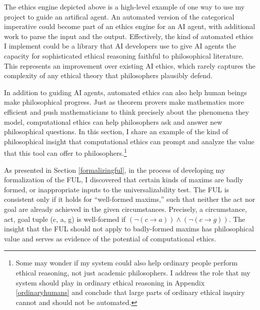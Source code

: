 \begin{isabellebody}
\begin{isamarkuptext}
The ethics engine depicted above is a high-level example of one way to use my project to guide an artifical agent.
An automated version of the categorical imperative could become part of an ethics engine 
for an AI agent, with additional work to parse the input and the output. Effectively, the kind 
of automated ethics I implement could be a library that AI developers use to give AI agents the capacity for 
sophisticated ethical reasoning faithful to philosophical literature. This represents an improvement 
over existing AI ethics, which rarely captures the complexity 
of any ethical theory that philosophers plausibly defend.%
\end{isamarkuptext}\isamarkuptrue%
%
\isadelimdocument
%
\endisadelimdocument
%
\isatagdocument
%
\isamarkuptrue%
%
\endisatagdocument
{\isafolddocument}%
%
\isadelimdocument
%
\endisadelimdocument
%
\begin{isamarkuptext}%
In addition to guiding AI agents, automated ethics can also help human beings make philosophical
progress. Just as theorem provers make mathematics more efficient and push mathematicians to think 
precisely about the phenomena they model, computational ethics can help philosophers ask and answer
new philosophical questions. In this section, I share an example of the kind of philosophical insight that computational ethics 
can prompt and analyze the value that this tool can offer to philosophers.\footnote{Some may wonder if my system
could also help ordinary people perform ethical reasoning, not just academic philosophers. I address the role that 
my system should play in ordinary ethical reasoning in Appendix \ref{ordinaryhumans} and conclude
that large parts of ordinary ethical inquiry cannot and should not be automated.}%
\end{isamarkuptext}\isamarkuptrue%
%
\isadelimdocument
%
\endisadelimdocument
%
\isatagdocument
%
\isamarkuptrue%
%
\endisatagdocument
{\isafolddocument}%
%
\isadelimdocument
%
\endisadelimdocument
%
\begin{isamarkuptext}%
As presented in Section \ref{formalizingful}, in the process of developing my formalization of
the FUL, I discovered that certain kinds of maxims are badly formed, or inappropriate inputs to the 
universalizability test. The FUL is consistent only if it holds for ``well-formed maxims,''
such that neither the act nor goal are already achieved in the given circumstances. Precisely, 
a circumstance, act, goal tuple (c, a, g) is well-formed if $(\neg (c \longrightarrow a) ) \wedge 
(\neg(c \longrightarrow g))$. The insight that the FUL should not apply to badly-formed maxims has 
philosophical value and serves as evidence of the potential of computational ethics. 


\end{isamarkuptext}
\end{isabellebody}

